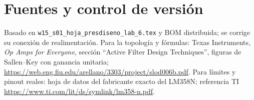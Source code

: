 \documentclass[10pt,a4paper]{article}
\begin{document}
\section*{Fuentes y control de versión}
Basado en \texttt{w15\_s01\_hoja\_presdiseno\_lab\_6.tex} y BOM distribuida; se corrige su conexión de realimentación. Para la topología y fórmulas: Texas Instruments, \emph{Op Amps for Everyone}, sección ``Active Filter Design Techniques'', figuras de Sallen–Key con ganancia unitaria; \url{https://web.eng.fiu.edu/arellano/3303/project/slod006b.pdf}. Para límites y pinout reales: hoja de datos del fabricante exacto del LM358N; referencia TI \url{https://www.ti.com/lit/ds/symlink/lm358-n.pdf}.
\end{document}
